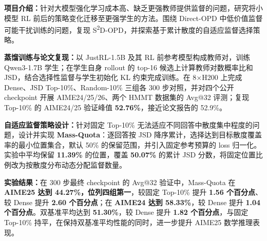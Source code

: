 
\textbf{项目介绍：}针对大模型强化学习成本高、缺乏更强教师提供监督的问题，研究将小模型 RL 前后的策略变化迁移至更强学生的方法。围绕 Direct-OPD 中低价值监督可能干扰训练的问题，复现 S\textsuperscript{2}D-OPD，并探索基于累计散度的自适应监督选择策略。\par
\begin{experienceitems}
  \item \textbf{蒸馏训练与论文复现：}以 JustRL-1.5B 及其 RL 前参考模型构成教师对，训练 Qwen3-1.7B 学生；在学生自身 rollout 的 top-16 候选上计算教师对数概率比和 JSD，结合选择性监督与学生初始化 KL 约束完成训练。在 8$\times$H200 上完成 Dense、JSD Top-10\%、Random-10\% 三组各 300 步对照，并对四个公开 checkpoint 开展 AIME24/25/26、两个 HMMT 数据集的 Avg@32 评测；复现 Top-10\% 的 AIME24/25 验证峰值 \textbf{52.76\%}，接近论文报告的 52.9\%。
  \item \textbf{自适应监督策略设计：}针对固定 Top-10\% 无法适应不同回答中散度集中程度的问题，设计并实现 \textbf{Mass-Quota}：逐回答按 JSD 降序累计，选择达到目标散度覆盖率的最小位置集合，默认 50\% 的保留范围，并引入固定参考预算的 loss 归一化。实验中平均保留 \textbf{11.39\%} 的位置，覆盖 \textbf{50.07\%} 的累计 JSD 分数，将固定位置比例改为按散度分布动态分配监督数量。
  \item \textbf{实验结果：}在 300 步最终 checkpoint 的 Avg@32 验证中，Mass-Quota 在 \textbf{AIME25 达到 44.27\%，位列四组第一}，较固定 Top-10\% 提升 \textbf{1.56 个百分点}、较 Dense 提升 \textbf{2.60 个百分点}；在 \textbf{AIME24 达到 58.33\%}，较 Dense 提升 \textbf{1.04 个百分点}。双基准平均达到 \textbf{51.30\%}，较 Dense 提升 \textbf{1.82 个百分点}，与固定 Top-10\% 持平，在保持双基准平均性能的同时，进一步提升 AIME25 数学推理表现。
\end{experienceitems}
